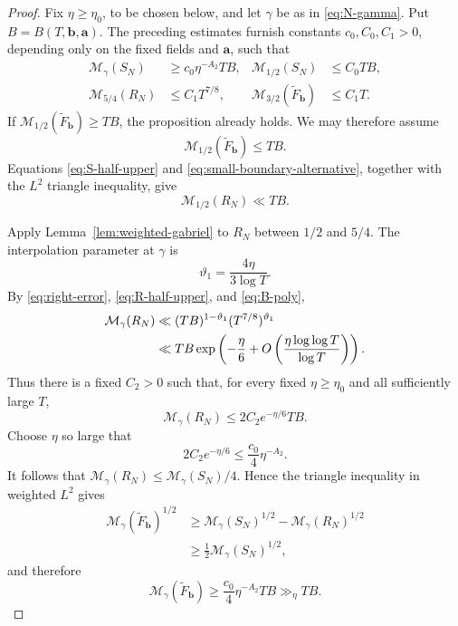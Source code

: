 \documentclass[11pt]{amsart}
\numberwithin{equation}{section}
\theoremstyle{plain}
\renewcommand{\tilde}{\widetilde}
\renewcommand{\le}{\leqslant}
\renewcommand{\ge}{\geqslant}
\begin{document}
\begin{proof}
Fix $\eta\ge\eta_0$, to be chosen below, and let $\gamma$ be as in
\eqref{eq:N-gamma}.  Put $B=B(T,\mathbf b,\mathbf a)$.  The preceding
estimates furnish constants $c_0,C_0,C_1>0$, depending only on the fixed
fields and $\mathbf a$, such that
\begin{align*}
\mathcal M_\gamma(S_N)&\ge c_0\eta^{-A_2}TB,
&\mathcal M_{1/2}(S_N)&\le C_0TB,\\
\mathcal M_{5/4}(R_N)&\le C_1T^{7/8},
&\mathcal M_{3/2}(\tilde F_{\mathbf b})&\le C_1T.
\end{align*}
If $\mathcal M_{1/2}(\tilde F_{\mathbf b})\ge TB$, the proposition already
holds.  We may therefore assume
\begin{equation}\label{eq:small-boundary-alternative}
\mathcal M_{1/2}(\tilde F_{\mathbf b})\le TB.
\end{equation}
Equations \eqref{eq:S-half-upper} and
\eqref{eq:small-boundary-alternative}, together with the $L^2$ triangle
inequality, give
\begin{equation}\label{eq:R-half-upper}
\mathcal M_{1/2}(R_N)\ll TB.
\end{equation}

Apply Lemma~\ref{lem:weighted-gabriel} to $R_N$ between $1/2$ and $5/4$.
The interpolation parameter at $\gamma$ is
\begin{equation*}
\vartheta_1=\frac{4\eta}{3\log T}.
\end{equation*}
By \eqref{eq:right-error}, \eqref{eq:R-half-upper}, and
\eqref{eq:B-poly},
\begin{align}
\mathcal M_\gamma(R_N)
&\ll (TB)^{1-\vartheta_1}(T^{7/8})^{\vartheta_1}\notag\\
&\ll TB\exp\left(-\frac{\eta}{6}
+O\left(\frac{\eta\log\log T}{\log T}\right)\right).  \label{eq:R-gamma-upper}
\end{align}
Thus there is a fixed $C_2>0$ such that, for every fixed
$\eta\ge\eta_0$ and all sufficiently large $T$,
\begin{equation*}
\mathcal M_\gamma(R_N)\le2C_2e^{-\eta/6}TB.
\end{equation*}
Choose $\eta$ so large that
\begin{equation}\label{eq:eta-choice}
2C_2e^{-\eta/6}\le \frac{c_0}{4}\eta^{-A_2}.
\end{equation}
It follows that
$\mathcal M_\gamma(R_N)\le\mathcal M_\gamma(S_N)/4$.  Hence the triangle
inequality in weighted $L^2$ gives
\begin{align*}
\mathcal M_\gamma(\tilde F_{\mathbf b})^{1/2}
&\ge \mathcal M_\gamma(S_N)^{1/2}
-\mathcal M_\gamma(R_N)^{1/2}\\
&\ge\tfrac12\mathcal M_\gamma(S_N)^{1/2},
\end{align*}
and therefore
\begin{equation}\label{eq:F-gamma-lower}
\mathcal M_\gamma(\tilde F_{\mathbf b})
\ge \frac{c_0}{4}\eta^{-A_2}TB\gg_\eta TB.
\end{equation}


\end{proof}
\end{document}
